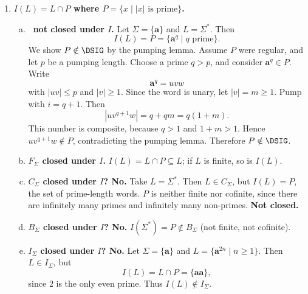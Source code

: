 \begin{enumerate}[{5.}1. ]
\begin{enumerate}[(a)]
  \item \textbf{Proof.}  The machine simulates $A$ on an original word while the
  counter records which positions are first, second, and third in each block of
  three.  At positions congruent to $1$ or $2$ modulo $3$, it reads the next
  input symbol and processes it through $\delta$; at positions congruent to $0$
  modulo $3$, it guesses and deletes one original symbol by a $\lambda$-move.
  Thus the visible input is exactly the word obtained from the original one by
  deleting every $3$rd, $6$th, $9$th, \dots letter.  Hence $L(A')=T(L)$.

  \item $L(A')\in\DSIG$. \qed
\end{enumerate}

\item \textbf{$I(L)=L\cap P$ where $P=\{x\mid|x|\text{ is prime}\}$.}

\begin{enumerate}[(a)]
  \item \textbf{\DSIG\ not closed under $I$.}  Let $\Sigma=\{\pmb{a}\}$ and
  $L=\Sigma^*$.  Then
  \[
  I(L)=P=\{\pmb{a}^q\mid q\text{ prime}\}.
  \]
  We show $P\notin\DSIG$ by the pumping lemma.  Assume $P$ were regular, and
  let $p$ be a pumping length.  Choose a prime $q>p$, and consider
  $\pmb{a}^q\in P$.  Write
  \[
  \pmb{a}^q=uvw
  \]
  with $|uv|\le p$ and $|v|\ge 1$.  Since the word is unary, let $|v|=m\ge 1$.
  Pump with $i=q+1$.  Then
  \[
  |uv^{q+1}w|=q+q m=q(1+m).
  \]
  This number is composite, because $q>1$ and $1+m>1$.  Hence
  $uv^{q+1}w\notin P$, contradicting the pumping lemma.  Therefore
  $P\notin\DSIG$.

  \item \textbf{$F_\Sigma$ closed under $I$.}  $I(L)=L\cap P\subseteq L$; if $L$ is finite, so is $I(L)$.

  \item \textbf{$C_\Sigma$ closed under $I$? No.}  Take $L=\Sigma^*$.  Then $L\in C_\Sigma$, but $I(L)=P$, the set of prime-length words.  $P$ is neither finite nor cofinite, since there are infinitely many primes and infinitely many non-primes.  \textbf{Not closed.}

  \item \textbf{$B_\Sigma$ closed under $I$? No.}  $I(\Sigma^*)=P\notin B_\Sigma$ (not finite, not cofinite).

  \item \textbf{$I_\Sigma$ closed under $I$? No.}  Let $\Sigma=\{\pmb{a}\}$ and
  $L=\{\pmb{a}^{2n}\mid n\ge 1\}$.  Then $L\in I_\Sigma$, but
  \[
  I(L)=L\cap P=\{\pmb{aa}\},
  \]
  since $2$ is the only even prime.  Thus $I(L)\notin I_\Sigma$.


\end{enumerate}
\end{enumerate}
